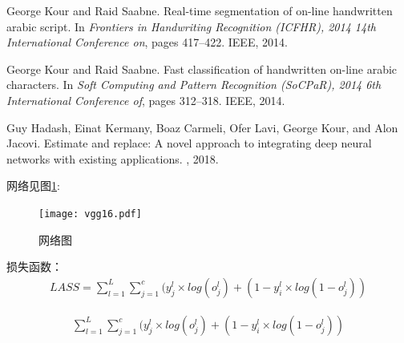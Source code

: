 \documentclass{article}
\begin{document}
\begin{thebibliography}{1}

George Kour and Raid Saabne.
\newblock Real-time segmentation of on-line handwritten arabic script.
\newblock In {\em Frontiers in Handwriting Recognition (ICFHR), 2014 14th
  International Conference on}, pages 417--422. IEEE, 2014.

George Kour and Raid Saabne.
\newblock Fast classification of handwritten on-line arabic characters.
\newblock In {\em Soft Computing and Pattern Recognition (SoCPaR), 2014 6th
  International Conference of}, pages 312--318. IEEE, 2014.

Guy Hadash, Einat Kermany, Boaz Carmeli, Ofer Lavi, George Kour, and Alon
  Jacovi.
\newblock Estimate and replace: A novel approach to integrating deep neural
  networks with existing applications.
, 2018.

\end{thebibliography}

网络见图\ref{networkvgg}:

\begin{figure}[h]
	\centering
	\texttt{[image: vgg16.pdf]}
	\caption{网络图}\label{networkvgg}
\end{figure}



损失函数：\begin{gather}
	LASS=\sum_{l=1}^{L}{\sum_{j=1}^{c}({y^l_j}\times log({o^l_j})} + (1-{y^l_i}\times log(1-{o^l_j}))
\end{gather}

\begin{gather}
\sum_{l=1}^{L}{\sum_{j=1}^{c}({y^l_j}\times log({o^l_j})} + (1-{y^l_i}\times log(1-{o^l_j}))
\end{gather}
\end{document}
